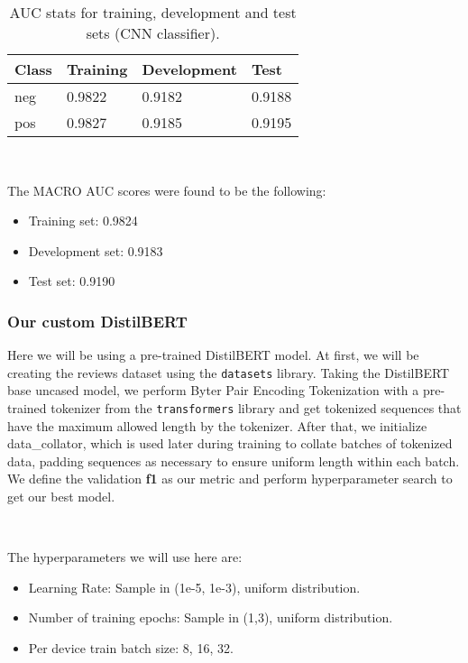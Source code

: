 \documentclass[10pt, a4paper]{article}
\begin{document}
	\begin{table}
		\begin{tabular}{|l|l|l|l|}
			\hline
			\cellcolor{blue!25}\textbf{Class} & \cellcolor{blue!25}\textbf{Training} & \cellcolor{blue!25}\textbf{Development} & \cellcolor{blue!25}\textbf{Test}\\
			\hline
			neg & 0.9822 & 0.9182 & 0.9188 \\\hline
			pos & 0.9827 & 0.9185 & 0.9195 \\\hline
			
		\end{tabular}
		\centering
		\caption{AUC stats for training, development and test sets (CNN classifier).}
		\label{tab::ex-2-stats-auc}
	\end{table}
	\
	
	The MACRO AUC scores were found to be the following:
	\begin{itemize}
		\item Training set: 0.9824
		\item Development set: 0.9183
		\item Test set: 0.9190
	\end{itemize}

        \subsubsection{Our custom DistilBERT}
        
        Here we will be using a pre-trained DistilBERT model. At first, we will be creating the reviews dataset using the \texttt{datasets} library. Taking the DistilBERT base uncased model, we perform Byter Pair Encoding Tokenization with a pre-trained tokenizer from the \texttt{transformers} library and get tokenized sequences that have the maximum allowed length by the tokenizer. After that, we initialize data\_collator, which is used later during training to collate batches of tokenized data, padding sequences as necessary to ensure uniform length within each batch. We define the validation \textbf{f1} as our metric and perform hyperparameter search to get our best model. 
        \ 
        
        \
 
    The hyperparameters we will use here are:
    \begin{itemize}
        \item Learning Rate: Sample in (1e-5, 1e-3), uniform distribution.
        \item Number of training epochs: Sample in (1,3), uniform distribution.
        \item Per device train batch size: 8, 16, 32.
        
    \end{itemize}
\end{document}
